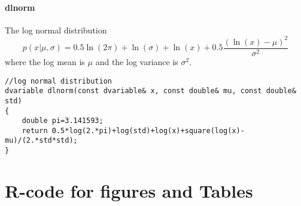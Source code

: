\paragraph{dlnorm} The log normal distribution
\[
	p(x|\mu,\sigma) = 0.5\ln(2\pi)+\ln(\sigma)+\ln(x)+0.5\frac{(\ln(x)-\mu)^2}{\sigma^2}
\]
where the log mean is $\mu$ and the log variance is $\sigma^2$.
\begin{verbatim}
//log normal distribution
dvariable dlnorm(const dvariable& x, const double& mu, const double& std)
{
	double pi=3.141593;
	return 0.5*log(2.*pi)+log(std)+log(x)+square(log(x)-mu)/(2.*std*std);
}
\end{verbatim}


\section{R-code for figures and Tables}
\begin{multicols}{2}


\end{multicols}